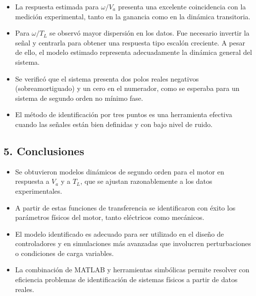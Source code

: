 \documentclass{article}
\begin{document}
\begin{itemize}
    \item La respuesta estimada para $\omega / V_a$ presenta una excelente coincidencia con la medición experimental, tanto en la ganancia como en la dinámica transitoria.
    \item Para $\omega / T_L$ se observó mayor dispersión en los datos. Fue necesario invertir la señal y centrarla para obtener una respuesta tipo escalón creciente. A pesar de ello, el modelo estimado representa adecuadamente la dinámica general del sistema.
    \item Se verificó que el sistema presenta dos polos reales negativos (sobreamortiguado) y un cero en el numerador, como se esperaba para un sistema de segundo orden no mínimo fase.
    \item El método de identificación por tres puntos es una herramienta efectiva cuando las señales están bien definidas y con bajo nivel de ruido.
\end{itemize}

\subsection{5. Conclusiones}

\begin{itemize}
    \item Se obtuvieron modelos dinámicos de segundo orden para el motor en respuesta a $V_a$ y a $T_L$, que se ajustan razonablemente a los datos experimentales.
    \item A partir de estas funciones de transferencia se identificaron con éxito los parámetros físicos del motor, tanto eléctricos como mecánicos.
    \item El modelo identificado es adecuado para ser utilizado en el diseño de controladores y en simulaciones más avanzadas que involucren perturbaciones o condiciones de carga variables.
    \item La combinación de MATLAB y herramientas simbólicas permite resolver con eficiencia problemas de identificación de sistemas físicos a partir de datos reales.
\end{itemize}
\end{document}
